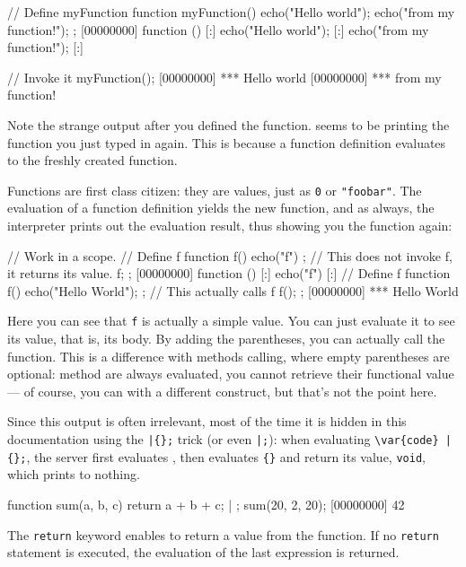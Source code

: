\begin{urbiscript}
// Define myFunction
function myFunction()
{
  echo("Hello world");
  echo("from my function!");
};
[00000000] function () {
[:]  echo("Hello world");
[:]  echo("from my function!");
[:]}

// Invoke it
myFunction();
[00000000] *** Hello world
[00000000] *** from my function!
\end{urbiscript}

Note the strange output after you defined the function. \us seems to
be printing the function you just typed in again. This is because
a function definition evaluates to the freshly created function.

Functions are first class citizen: they are values, just as
\lstinline{0} or \lstinline{"foobar"}.  The evaluation of a function
definition yields the new function, and as always, the interpreter
prints out the evaluation result, thus showing you the function
again:

\begin{urbiscript}
// Work in a scope.
{
  // Define f
  function f()
  {
    echo("f")
  };
  // This does not invoke f, it returns its value.
  f;
};
[00000000] function () {
[:]  echo("f")
[:]}
{
  // Define f
  function f()
  {
    echo("Hello World");
  };
  // This actually calls f
  f();
};
[00000000] *** Hello World
\end{urbiscript}

Here you can see that \lstinline{f} is actually a simple value. You can just
evaluate it to see its value, that is, its body. By adding the
parentheses, you can actually call the function. This is a difference
with methods calling, where empty parentheses are optional: method are
always evaluated, you cannot retrieve their functional value --- of
course, you can with a different construct, but that's not the point
here.

Since this output is often irrelevant, most of the time it is hidden
in this documentation using the \lstinline'|{};' trick (or even
\lstinline'|;'): when evaluating \lstinline'\var{code} | {};', the
server first evaluates , then evaluates \lstinline'{}' and
return its value, \lstinline'void', which prints to nothing.

\begin{urbiscript}
function sum(a, b, c)
{
  return a + b + c;
} | {};
sum(20, 2, 20);
[00000000] 42
\end{urbiscript}

The \lstinline{return} keyword enables to return a value from the
function. If no \lstinline{return} statement is executed, the
evaluation of the last expression is returned.

